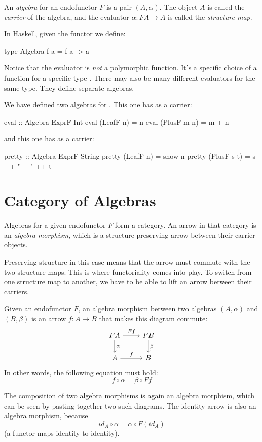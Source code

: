 \documentclass[DaoFP]{subfiles}
\begin{document}
An \emph{algebra} for an endofunctor $F$ is a pair $(A, \alpha)$. The object $A$ is called the \emph{carrier} of the algebra, and the evaluator $\alpha \colon F A \to A$ is called the \emph{structure map}.

In Haskell, given the functor  we define:
\begin{haskell}
type Algebra f a = f a -> a
\end{haskell}

Notice that the evaluator is \emph{not} a polymorphic function. It's a specific choice of a function for a specific type . There may also be many different evaluators for the same type. They define separate algebras.

We have defined two algebras for . This one has  as a carrier:
\begin{haskell}
eval :: Algebra ExprF Int
eval (LeafF n)   = n
eval (PlusF m n) = m + n
\end{haskell}
and this one has  as a carrier:
\begin{haskell}
pretty :: Algebra ExprF String
pretty (LeafF n)   = show n
pretty (PlusF s t) = s ++ " + " ++ t
\end{haskell}

\section{Category of Algebras}

Algebras for a given endofunctor $F$ form a category. An arrow in that category is an \emph{algebra morphism}, which is a structure-preserving arrow between their carrier objects. 

Preserving structure in this case means that the arrow must commute with the two structure maps. This is where functoriality comes into play. To switch from one structure map to another, we have to be able to lift an arrow between their carriers. 

Given an endofunctor $F$, an algebra morphism between two algebras $(A, \alpha)$ and $(B, \beta)$ is an arrow $f \colon A \to B$ that makes this diagram commute:
\[
 \begin{tikzcd}
 F A 
 \arrow[r, "F f"]
 \arrow[d, "\alpha"]
 & F B
\arrow[d, "\beta"]
 \\
 A
 \arrow[r, "f"]
 & B
  \end{tikzcd}
\]
In other words, the following equation must hold:
\[f \circ \alpha = \beta \circ F f \]

The composition of two algebra morphisms is again an algebra morphism, which can be seen by pasting together two such diagrams. The identity arrow is also an algebra morphism, because 
\[ id_A \circ \alpha = \alpha \circ F (id_A) \]
(a functor maps identity to identity).
\end{document}

